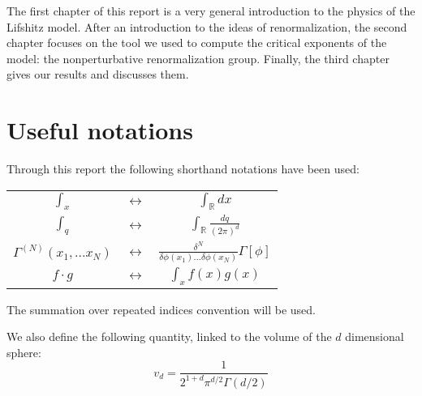 The first chapter of this report is a very general introduction to the physics of the Lifshitz model. 
After an introduction to the ideas of renormalization, the second chapter focuses on the tool we used to compute the critical exponents of the model: the nonperturbative renormalization group. 
Finally, the third chapter gives our results and discusses them.



\section*{Useful notations}
Through this report the following shorthand notations have been used:

\begin{center}
\begin{tabular}{ccc}
$\int_x$ & $\leftrightarrow$ &  $\int_{\mathds{R}} dx$ \\ 
$\int_q$ & $\leftrightarrow$ &  $\int_{\mathds{R}} \frac{dq}{(2\pi)^d}$ \\ 
$\Gamma^{(N)}(x_1,...x_N)$ & $\leftrightarrow$ &  $\frac{\delta^N }{\delta \phi(x_1) ... \delta \phi(x_N)} \Gamma[\phi]$ \\ 
$f \cdot g$ & $\leftrightarrow$ &  $\int_x f(x) g(x)$ \\
\end{tabular} 
\end{center}

The summation over repeated indices convention will be used.

We also define the following quantity, linked to the volume of the $d$ dimensional sphere:
\begin{equation}
v_d = \frac{1}{2^{1+d} \pi^{d/2} \Gamma\left(d/2\right)}
\end{equation}